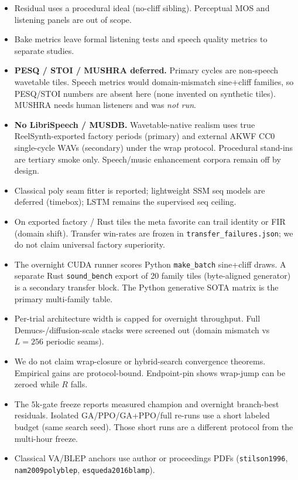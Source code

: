 \begin{itemize}
  \item Residual uses a procedural ideal (no-cliff sibling). Perceptual MOS and listening panels are out of scope.
  \item Bake metrics leave formal listening tests and speech quality metrics to separate studies.
  \item \textbf{PESQ / STOI / MUSHRA deferred.} Primary cycles are non-speech wavetable tiles. Speech metrics would domain-mismatch sine{+}cliff families, so PESQ/STOI numbers are absent here (none invented on synthetic tiles). MUSHRA needs human listeners and was \emph{not run}.
  \item \textbf{No LibriSpeech / MUSDB.} Wavetable-native realism uses true ReelSynth-exported factory periods (primary) and external AKWF CC0 single-cycle WAVs (secondary) under the wrap protocol. Procedural stand-ins are tertiary smoke only. Speech/music enhancement corpora remain off by design.
  \item Classical poly seam fitter is reported; lightweight SSM seq models are deferred (timebox); LSTM remains the supervised seq ceiling.
  \item On exported factory / Rust tiles the meta favorite can trail identity or FIR (domain shift). Transfer win-rates are frozen in \texttt{transfer\_failures.json}; we do not claim universal factory superiority.
  \item The overnight CUDA runner scores Python \texttt{make\_batch} sine{+}cliff draws. A separate Rust \texttt{sound\_bench} export of 20 family tiles (byte-aligned generator) is a secondary transfer block. The Python generative SOTA matrix is the primary multi-family table.
  \item Per-trial architecture width is capped for overnight throughput. Full Demucs-/diffusion-scale stacks were screened out (domain mismatch vs $L{=}256$ periodic seams).
  \item We do not claim wrap-closure or hybrid-search convergence theorems. Empirical gains are protocol-bound. Endpoint-pin shows wrap-jump can be zeroed while $R$ falls.
  \item The $5$k-gate freeze reports measured champion and overnight branch-best residuals. Isolated GA/PPO/GA{+}PPO/full re-runs use a short labeled budget (same search seed). Those short runs are a different protocol from the multi-hour freeze.
  \item Classical VA/BLEP anchors use author or proceedings PDFs (\texttt{stilson1996}, \texttt{nam2009polyblep}, \texttt{esqueda2016blamp}).
\end{itemize}

